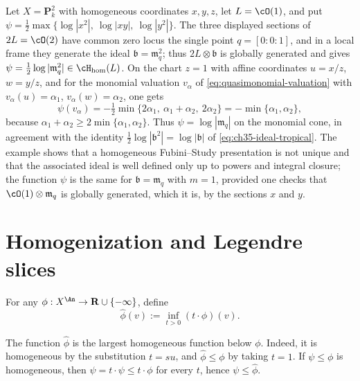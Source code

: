 \begin{example}
\label{ex:ch35-monomial-hom-fs}
Let $X=\mathbf P^2_k$ with homogeneous coordinates $x,y,z$, let
$L=\cO(1)$, and put
$\psi=\tfrac12\max\{\log|x^2|,\ \log|xy|,\ \log|y^2|\}$.  The three
displayed sections of $2L=\cO(2)$ have common zero locus the single point
$q=[0:0:1]$, and in a local frame they generate the ideal
$\mathfrak b=\mathfrak m_q^2$; thus $2L\otimes\mathfrak b$ is globally
generated and  gives
$\psi=\tfrac12\log|\mathfrak m_q^2|\in\cH_{\mathrm{hom}}(L)$.
On the chart $z=1$ with affine coordinates $u=x/z$,
$w=y/z$, and for the monomial valuation $v_\alpha$ of
\eqref{eq:quasimonomial-valuation} with
$v_\alpha(u)=\alpha_1$, $v_\alpha(w)=\alpha_2$, one gets
\[
 \psi(v_\alpha)=-\tfrac12\min\{2\alpha_1,\ \alpha_1+\alpha_2,\ 2\alpha_2\}
 =-\min\{\alpha_1,\alpha_2\},
\]
because $\alpha_1+\alpha_2\geq2\min\{\alpha_1,\alpha_2\}$.  Thus
$\psi=\log|\mathfrak m_q|$ on the monomial cone, in agreement with the
identity $\tfrac12\log|\mathfrak b^2|=\log|\mathfrak b|$ of
\eqref{eq:ch35-ideal-tropical}.  The example shows that a homogeneous
Fubini--Study presentation is not unique and that the associated ideal is
well defined only up to powers and integral closure; the function
$\psi$ is the same for $\mathfrak b=\mathfrak m_q$ with $m=1$,
provided one checks that $\cO(1)\otimes\mathfrak m_q$ is globally
generated, which it is, by the sections $x$ and $y$.
\end{example}

\section{Homogenization and Legendre slices}
\label{sec:ch35-homogenization}

\begin{definition}[Homogenization]
\label{def:bj-homogenization}
For any $\phi:X^{\An}\to\mathbf R\cup\{-\infty\}$, define
\begin{equation}
\label{eq:bj-homogenization}
                 \widehat\phi(v):=\inf_{t>0}(t\cdot\phi)(v).
\end{equation}
\end{definition}

The function $\widehat\phi$ is the largest homogeneous function below
$\phi$.  Indeed, it is homogeneous by the substitution $t=su$, and
$\widehat\phi\leq\phi$ by taking $t=1$.  If $\psi\leq\phi$ is
homogeneous, then $\psi=t\cdot\psi\leq t\cdot\phi$ for every $t$, hence
$\psi\leq\widehat\phi$.

